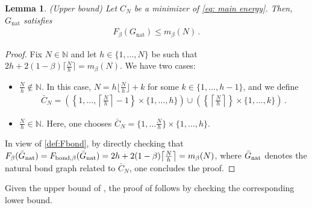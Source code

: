 \documentclass[reqno]{amsart}
\theoremstyle{plain}
\newtheorem{lemma}[theorem]{Lemma}
\theoremstyle{definition}
\numberwithin{equation}{section}
\begin{document}
\begin{lemma}(Upper bound) \label{lemma:energybound}Let $C_N$ be a minimizer of \eqref{eq: main energy}. Then, $G_{\mathrm{nat}}$ satisfies
\begin{align*}
 F_\beta  (G_{\mathrm{nat}}) \leq m_\beta(N)\,.
\end{align*}
\end{lemma}
\begin{proof} Fix $N \in \mathbb{N}$ and let $h \in \{1,\ldots,N\}$ be such that $2h+ 2(1-\beta) \big\lceil \frac{N}{h}\big\rceil = m_\beta(N)$. We have two cases:
\begin{itemize}
\item[(i)] $\frac{N}{h} \notin \mathbb{N}$. In this case, $N=h\lfloor \frac{N}{h}\rfloor +k$ for some $k \in \{1,\ldots,h-1\}$, and we define 
\begin{align*}
 \bar{C}_N  =\left(\left\{1,\ldots,\left\lceil \frac{N}{h}\right\rceil-1\right\} \times \{1,\ldots,h\}\right) \cup \left( \left\{\left\lceil \frac{N}{h}\right\rceil \right\}\times\{1,\ldots,k\}\right)\,.
\end{align*}
\item[(ii)] $\frac{N}{h} \in \mathbb{N}$. Here, one chooses $ \bar{C}_N  = \{1,\ldots\frac{N}{h}\} \times \{1,\ldots,h\}$.
\end{itemize}
%
%
 In view of \eqref{def:Fbond},  by directly checking that $F_\beta(\bar{G}_{\rm nat} ) =F_{\mathrm{bond},\beta}(\bar{G}_{\rm nat}) = 2h+ 2(1-\beta) \big\lceil \frac{N}{h}\big\rceil = m_\beta(N)$, where $ \bar{G}_{\rm nat} $ denotes the natural bond graph related to $\bar{C}_N$, one concludes the proof.
\end{proof}

 Given the upper bound of , the proof of
 follows by checking the corresponding lower
bound. 

\end{document}
